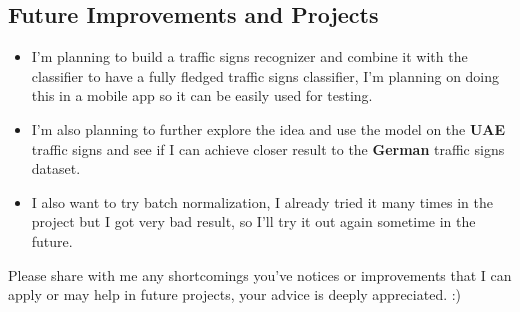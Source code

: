 \documentclass[11pt]{article}
\providecommand{\tightlist}{%
      \setlength{\itemsep}{0pt}\setlength{\parskip}{0pt}}
\begin{document}
    \hypertarget{future-improvements-and-projects}{%
\subsection{Future Improvements and
Projects}\label{future-improvements-and-projects}}

\begin{itemize}
\tightlist
\item
  I'm planning to build a traffic signs recognizer and combine it with
  the classifier to have a fully fledged traffic signs classifier, I'm
  planning on doing this in a mobile app so it can be easily used for
  testing.
\item
  I'm also planning to further explore the idea and use the model on the
  \textbf{UAE} traffic signs and see if I can achieve closer result to
  the \textbf{German} traffic signs dataset.
\item
  I also want to try batch normalization, I already tried it many times
  in the project but I got very bad result, so I'll try it out again
  sometime in the future.
\end{itemize}

Please share with me any shortcomings you've notices or improvements
that I can apply or may help in future projects, your advice is deeply
appreciated. :)


    
    
    
    
\end{document}
